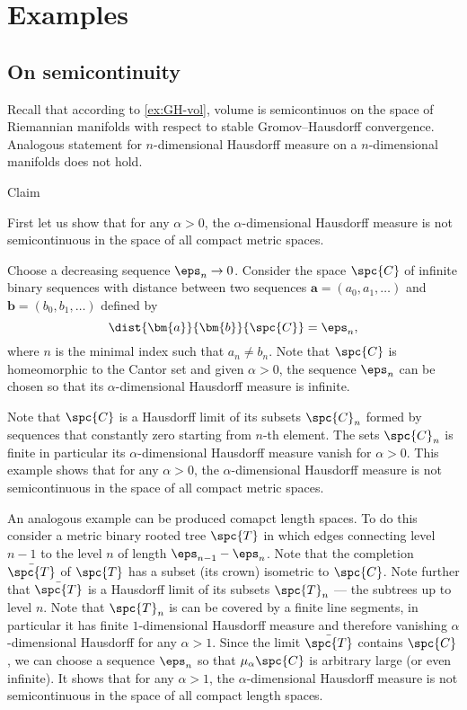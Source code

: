 \chapter{Examples}



\section{On semicontinuity}

Recall that according to \ref{ex:GH-vol}, volume is semicontinuos on the space of Riemannian manifolds with respect to stable Gromov--Hausdorff convergence.
Analogous statement for $n$-dimensional Hausdorff measure on a $n$-dimensional manifolds does not hold.

\begin{thm}{Claim}
 
\end{thm}

First let us show that for any $\alpha>0$, the $\alpha$-dimensional Hausdorff measure is not semicontinuous in the space of all compact metric spaces.

Choose a decreasing sequence $\eps_n\to 0$.
Consider the space $\spc{C}$ of infinite binary sequences with distance between two sequences $\bm{a}=(a_0,a_1,\dots)$ and $\bm{b}=(b_0,b_1,\dots)$ defined by 
\[\dist{\bm{a}}{\bm{b}}{\spc{C}}=\eps_n,\]
where $n$ is the minimal index such that $a_n\ne b_n$.
Note that $\spc{C}$ is homeomorphic to the Cantor set and 
given $\alpha>0$,
the sequence $\eps_n$ can be chosen so that its $\alpha$-dimensional Hausdorff measure is infinite.

Note that $\spc{C}$ is a Hausdorff limit of its subsets $\spc{C}_n$ formed by sequences that constantly zero starting from $n$-th element.
The sets $\spc{C}_n$ is finite in particular its $\alpha$-dimensional Hausdorff measure vanish for $\alpha>0$.
This example shows that for any $\alpha>0$, the $\alpha$-dimensional Hausdorff measure is not semicontinuous in the space of all compact metric spaces.

An analogous example can be produced comapct length spaces.
To do this consider a metric binary rooted tree $\spc{T}$ in which edges connecting level $n-1$ to the level $n$ of length $\eps_{n-1}-\eps_n$.
Note that the completion $\bar{\spc{T}}$ of $\spc{T}$ has a subset (its crown) isometric to $\spc{C}$.
Note further that $\bar{\spc{T}}$ is a Hausdorff limit of its subsets $\spc{T}_n$ --- the subtrees up to level $n$.
Note that $\spc{T}_n$ is can be covered by a finite line segments, in particular it has finite $1$-dimensional Hausdorff measure and therefore vanishing $\alpha$-dimensional Hausdorff for any $\alpha>1$.
Since the limit $\bar{\spc{T}}$ contains $\spc{C}$, we can choose a sequence $\eps_n$ so that $\mu_\alpha\spc{C}$ is arbitrary large (or even infinite).
It shows that for any $\alpha>1$, the $\alpha$-dimensional Hausdorff measure is not semicontinuous in the space of all compact length spaces.

